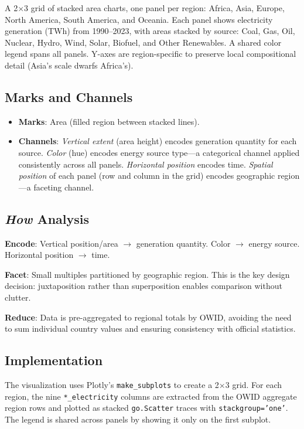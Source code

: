 \documentclass[10pt]{article}
\begin{document}
A 2$\times$3 grid of stacked area charts, one panel per region: Africa, Asia, Europe, North America, South America, and Oceania. Each panel shows electricity generation (TWh) from 1990--2023, with areas stacked by source: Coal, Gas, Oil, Nuclear, Hydro, Wind, Solar, Biofuel, and Other Renewables. A shared color legend spans all panels. Y-axes are region-specific to preserve local compositional detail (Asia's scale dwarfs Africa's).

\subsection{Marks and Channels}

\begin{itemize}
    \item \textbf{Marks}: Area (filled region between stacked lines).
    \item \textbf{Channels}: \emph{Vertical extent} (area height) encodes generation quantity for each source. \emph{Color} (hue) encodes energy source type---a categorical channel applied consistently across all panels. \emph{Horizontal position} encodes time. \emph{Spatial position} of each panel (row and column in the grid) encodes geographic region---a faceting channel.
\end{itemize}

\subsection{\emph{How} Analysis}

\textbf{Encode}: Vertical position/area $\rightarrow$ generation quantity. Color $\rightarrow$ energy source. Horizontal position $\rightarrow$ time.

\textbf{Facet}: Small multiples partitioned by geographic region. This is the key design decision: juxtaposition rather than superposition enables comparison without clutter.

\textbf{Reduce}: Data is pre-aggregated to regional totals by OWID, avoiding the need to sum individual country values and ensuring consistency with official statistics.

\subsection{Implementation}

The visualization uses Plotly's \texttt{make\_subplots} to create a 2$\times$3 grid. For each region, the nine \texttt{*\_electricity} columns are extracted from the OWID aggregate region rows and plotted as stacked \texttt{go.Scatter} traces with \texttt{stackgroup='one'}. The legend is shared across panels by showing it only on the first subplot.
\end{document}
